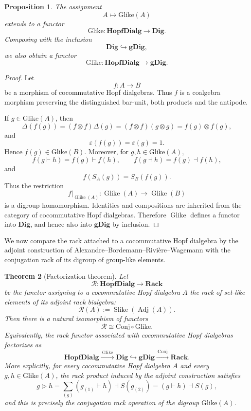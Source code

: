 \documentclass[11pt]{article}
\theoremstyle{plain}
\newtheorem{theorem}{Theorem}[section]
\newtheorem{proposition}[theorem]{Proposition}
\theoremstyle{definition}
\theoremstyle{remark}
\DeclareMathOperator{\Glike}{Glike}
\DeclareMathOperator{\Slike}{Slike}
\DeclareMathOperator{\Adj}{Adj}
\begin{document}
	\begin{proposition}\label{prop:glike-functor}
		The assignment
		\[
		A\longmapsto \mathrm{Glike}(A)
		\]
		extends to a functor
		\[
		\mathrm{Glike}:\mathbf{HopfDialg}\longrightarrow \mathbf{Dig}.
		\]
		Composing with the inclusion
		\[
		\mathbf{Dig}\hookrightarrow \mathbf{gDig},
		\]
		we also obtain a functor
		\[
		\mathrm{Glike}:\mathbf{HopfDialg}\longrightarrow \mathbf{gDig}.
		\]
	\end{proposition}
	
	\begin{proof}
		Let
		\[
		f:A\longrightarrow B
		\]
		be a morphism of cocommutative Hopf dialgebras. Thus \(f\) is a coalgebra
		morphism preserving the distinguished bar-unit, both products and the
		antipode.
		
		If \(g\in\mathrm{Glike}(A)\), then
		\[
		\Delta(f(g))
		=
		(f\otimes f)\Delta(g)
		=
		(f\otimes f)(g\otimes g)
		=
		f(g)\otimes f(g),
		\]
		and
		\[
		\varepsilon(f(g))=\varepsilon(g)=1.
		\]
		Hence \(f(g)\in\mathrm{Glike}(B)\). Moreover, for
		\(g,h\in\mathrm{Glike}(A)\),
		\[
		f(g\vdash h)=f(g)\vdash f(h),
		\qquad
		f(g\dashv h)=f(g)\dashv f(h),
		\]
		and
		\[
		f(S_A(g))=S_B(f(g)).
		\]
		Thus the restriction
		\begin{equation*}
			f\vert_{\Glike(A)}:
			\Glike(A)\longrightarrow \Glike(B)
		\end{equation*}
		is a digroup homomorphism. Identities and compositions are inherited from
		the category of cocommutative Hopf dialgebras. Therefore
		\(\Glike\) defines a functor into \(\mathbf{Dig}\), and hence also
		into \(\mathbf{gDig}\) by inclusion.
	\end{proof}
	
	We now compare the rack attached to a cocommutative Hopf dialgebra by the
	adjoint construction of Alexandre--Bordemann--Rivi\`ere--Wagemann with the
	conjugation rack of its digroup of group-like elements.
	
	\begin{theorem}[Factorization theorem]\label{thm:factorization-through-glike}
		Let
		\[
		\mathcal{R}:
		\mathbf{HopfDialg}
		\longrightarrow
		\mathbf{Rack}
		\]
		be the functor assigning to a cocommutative Hopf dialgebra \(A\) the rack of
		set-like elements of its adjoint rack bialgebra:
		\[
		\mathcal R(A):=\Slike(\Adj(A)).
		\]
		Then there is a natural isomorphism of functors
		\[
		\mathcal{R}
		\cong
		\mathrm{Conj}\circ\mathrm{Glike}.
		\]
		Equivalently, the rack functor associated with cocommutative Hopf dialgebras
		factorizes as
		\[
		\mathbf{HopfDialg}
		\xrightarrow{\ \mathrm{Glike}\ }
		\mathbf{Dig}
		\hookrightarrow
		\mathbf{gDig}
		\xrightarrow{\ \mathrm{Conj}\ }
		\mathbf{Rack}.
		\]
		More explicitly, for every cocommutative Hopf dialgebra \(A\) and every
		\(g,h\in\mathrm{Glike}(A)\), the rack product induced by the adjoint
		construction satisfies
		\[
		g\triangleright h
		=
		\sum_{(g)}(g_{(1)}\vdash h)\dashv S(g_{(2)})
		=
		(g\vdash h)\dashv S(g),
		\]
		and this is precisely the conjugation rack operation of the digroup
		\(\mathrm{Glike}(A)\).
	\end{theorem}
	
\end{document}
